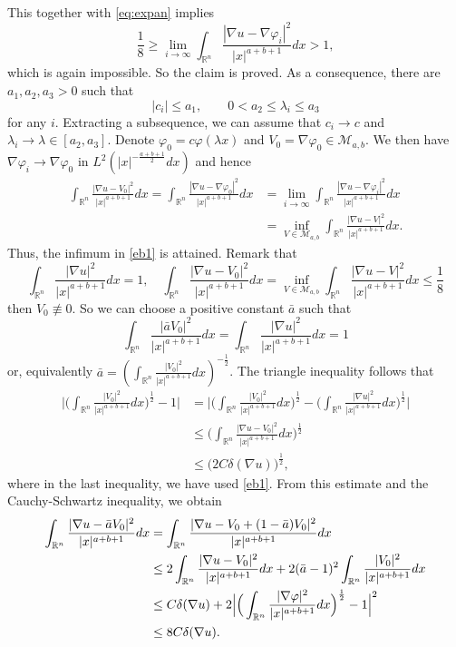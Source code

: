 \documentclass[a4paper,12pt]{article}
\theoremstyle{plain}
\theoremstyle{definition}
\theoremstyle{remark}
\def\R{\mathbb R}%
\def\lam{\lambda}%
\def\na{\nabla}%
\def\irn{\int_{\R^n}}
\numberwithin{equation}{section}
\begin{document}
This together with \eqref{eq:expan} implies
$$\frac18 \geq \lim_{i\to \infty} \irn \frac{|\na u -\na \varphi_i|^2}{|x|^{a+b+1}} dx > 1,$$
which is again impossible. So the claim is proved. As a consequence, there are $a_1, a_2, a_3 >0$ such that 
$$|c_i|\leq a_1,\qquad 0< a_2 \leq \lam_i \leq a_3$$
for any $i$. Extracting a subsequence, we can assume that $c_i \to c$ and $\lam_i \to \lam \in [a_2,a_3]$. Denote $\varphi_0 = c \varphi(\lambda x)$ and $V_0=\nabla \varphi_0\in \mathcal M_{a,b}$. We then have $\na \varphi_i \to \na \varphi_0$ in $L^2(|x|^{-\frac{a+b+1}{2}}dx)$ and hence
\begin{align*}
\irn \frac{|\na u- V_0|^2}{|x|^{a+b+1}} dx =\irn \frac{|\na u- \na \varphi_0|^2}{|x|^{a+b+1}} dx& = \lim_{i\to \infty} \irn\frac{ |\na u -\na \varphi_i|^2 }{|x|^{a+b+1}}dx\\
& = \inf_{V \in \mathcal M_{a,b}} \irn\frac{ |\na u -V|^2}{|x|^{a+b+1}} dx.
\end{align*}
Thus, the infimum in \eqref{eb1} is attained.
Remark that 
$$\irn\frac{ |\na u|^2}{|x|^{a+b+1}} dx =1,\quad \irn\frac{ |\na u- V_0|^2 }{|x|^{a+b+1}}dx = \inf_{V \in \mathcal M_{a,b}} \irn \frac{|\na u -V|^2 }{|x|^{a+b+1}}dx \leq \frac 18$$ 
then $V_0\not\equiv 0$. So we can choose a positive constant $\bar{a}$ such that 
$$\irn\frac{ |\bar{a} V_0|^2}{|x|^{a+b+1}} dx = \irn\frac{ |\na u|^2}{|x|^{a+b+1}} dx = 1$$
or, equivalently $\bar{a} = (\irn \frac{|V_0|^2}{|x|^{a+b+1}} dx)^{-\frac12}$. The triangle inequality follows that 
\begin{align*}
	\Big|\Big(\irn\frac{ |V_0|^2}{|x|^{a+b+1}} dx\Big)^{\frac12} -1\Big| &= \Big|\Big(\irn\frac{ |V_0|^2}{|x|^{a+b+1}} dx\Big)^{\frac12} -\Big(\irn \frac{|\na u|^2}{|x|^{a+b+1}} dx\Big)^{\frac12}\Big|\\
	&\leq \Big(\irn \frac{|\na u-V_0|^2}{|x|^{a+b+1}} dx\Big)^{\frac12} \\
	&\leq \big(2C\delta(\nabla u)\big)^{\frac 12},
\end{align*}
where in the last inequality, we have used \eqref{eb1}.
From this estimate and the Cauchy-Schwartz inequality, we obtain
\begin{align*}
	\irn\frac{ |\na u - \bar{a} V_0|^2 }{|x|^{a+b+1}}dx &= \irn\frac{ |\na u -V_0  + (1-\bar{a})V_0|^2}{|x|^{a+b+1}} dx\notag\\
	&\leq 2 \irn\frac{ |\na u -V_0|^2 }{|x|^{a+b+1}}dx + 2 (\bar{a}-1)^2 \irn \frac{|V_0|^2}{|x|^{a+b+1}} dx\notag\\
	&\leq C\delta(\nabla u) + 2 \Big|\Big(\irn \frac{|\na \varphi|^2 }{|x|^{a+b+1}}dx\Big)^{\frac12} -1\Big|^2\notag\\
	&\leq 8C\delta(\nabla u).
\end{align*}
\end{document}
